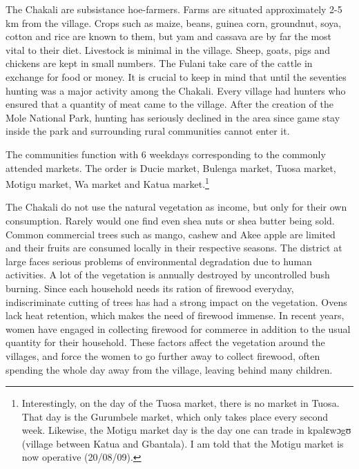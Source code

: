 The Chakali are subsistance  hoe-farmers. Farms are situated approximately 2-5
km from the village.  Crops  such as maize, beans, guinea
corn, groundnut, soya, cotton and  rice are known to them, but yam and cassava
are by far the most vital to their diet.  Livestock is minimal in the village.
Sheep, goats, pigs and chickens are kept in small numbers. The Fulani  take
care
of the cattle in exchange for food or money.  It is crucial to keep in mind that
until the seventies  hunting was a major activity among the Chakali. Every
village had hunters who ensured that  a quantity of meat came to the village.
After the creation of the Mole National Park, hunting has seriously declined in
the area since game stay inside  the park and surrounding rural communities
cannot enter it.

The communities function with 6 weekdays corresponding to the commonly attended
markets. The order is Ducie market, Bulenga market, Tuosa market, Motigu
market, Wa market and Katua market.\footnote{Interestingly, on the day of the
Tuosa
market, there is no market in Tuosa.  That day is the Gurumbele market,  which 
only takes place every second week. Likewise, the Motigu market day is the day
one can trade in  {\F kpalɛwɔgʊ}  (village between Katua and Gbantala). I am  
told that the Motigu market is now operative (20/08/09).}


% 





The Chakali do not use the natural vegetation as income,
but only for their own consumption. Rarely  would one find even shea nuts or
shea
butter being sold. Common commercial trees such as mango, cashew
and Akee
apple are limited and their fruits are consumed locally in their respective
seasons. The district at large faces  serious problems of environmental
degradation due to human activities. A lot of the vegetation is annually
destroyed by uncontrolled bush burning. Since each household needs its ration of
firewood everyday, indiscriminate cutting of trees has had a strong impact on
the vegetation. Ovens lack
heat retention,  which makes the need of firewood immense.  In
recent years,  women have engaged in collecting firewood for commerce in
addition to the usual quantity for their household. These factors affect the
vegetation around the villages, and force
the women to go further away to collect firewood, often spending the whole day
away from the village, leaving behind many children. 
%

